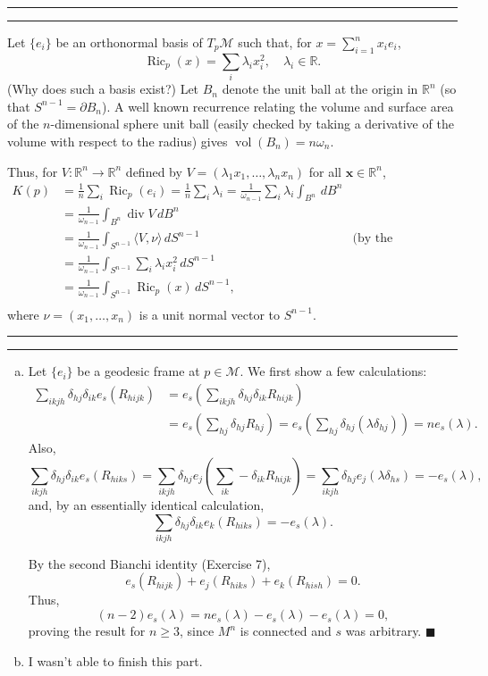 \documentclass[11pt]{article}
\newcounter{questionCounter}
\newcounter{partCounter}[questionCounter]
\newenvironment{question}[2][\arabic{questionCounter}]{%
    \setcounter{partCounter}{0}%
    \vspace{.25in} \hrule \vspace{0.5em}%
        \noindent{\bf #2}%
    \vspace{0.8em} \hrule \vspace{.10in}%
    \addtocounter{questionCounter}{1}%
}{}
\renewcommand{\qed}{\quad \ensuremath{\blacksquare}}    %
\newcommand{\bx}{\mathbf{x}}
\renewcommand{\div}{\operatorname{div}} %
\newcommand{\Ric}{\operatorname{Ric}}   %
\newcommand{\R}{\mathbb{R}}             %
\newcommand{\M}{\mathcal{M}}            %
\begin{document}
\begin{question}{Exercise 9}
Let $\{e_i\}$ be an orthonormal basis of $T_p\M$ such that, for
$x = \sum_{i = 1}^n x_ie_i$,
\[\Ric_p(x) = \sum_i \lambda_i x_i^2,\quad \lambda_i \in \R.\]
(Why does such a basis exist?)
Let $B_n$ denote the unit ball at the origin in $\R^n$ (so that
$S^{n - 1} = \partial B_n$). A well known recurrence relating the volume and
surface area of the $n$-dimensional sphere unit ball (easily checked by taking
a derivative of the volume with respect to the radius) gives
$\operatorname{vol}(B_n) = n \omega_n$.

Thus, for $V : \R^n \to \R^n$ defined by
$V = (\lambda_1 x_1,\dots,\lambda_n x_n)$ for all $\bx \in \R^n$,
\begin{align*}
K(p)
 &  = \frac{1}{n} \sum_i \Ric_p(e_i)
    = \frac{1}{n} \sum_i \lambda_i
    = \frac{1}{\omega_{n - 1}} \sum_i \lambda_i \int_{B^n} \, dB^n \\
 &  = \frac{1}{\omega_{n - 1}} \int_{B^n} \div V \, dB^n \\
 &  = \frac{1}{\omega_{n - 1}} \int_{S^{n - 1}}
                                        \langle V, \nu \rangle \, dS^{n - 1}
 & \mbox{(by the Divergence Theorem)}      \\
 &  = \frac{1}{\omega_{n - 1}} \int_{S^{n - 1}}
                                        \sum_i \lambda_i x_i^2 \, dS^{n - 1} \\
 &  = \frac{1}{\omega_{n - 1}} \int_{S^{n - 1}} \Ric_p(x) \, dS^{n - 1}, \\
\end{align*}
where $\nu = (x_1,\dots,x_n)$ is a unit normal vector to $S^{n - 1}$.
\end{question}

\begin{question}{Exercise 10}
\begin{enumerate}[a)]
\item Let $\{e_i\}$ be a geodesic frame at $p \in \M$. We first show a few
calculations:
\begin{align*}
\sum_{ikjh} \delta_{hj}\delta_{ik}e_s(R_{hijk})
 &  = e_s \left( \sum_{ikjh} \delta_{hj}\delta_{ik} R_{hijk} \right) \\
 &  = e_s \left( \sum_{hj} \delta_{hj} R_{hj} \right)               
    = e_s \left( \sum_{hj} \delta_{hj}(\lambda\delta_{hj})  \right)
    = ne_s(\lambda).
\end{align*}
Also,
\[
\sum_{ikjh} \delta_{hj}\delta_{ik} e_s(R_{hiks})
 = \sum_{ikjh} \delta_{hj} e_j \left( \sum_{ik} -\delta_{ik} R_{hijk} \right)
 = \sum_{ikjh} \delta_{hj} e_j(\lambda \delta_{hs})
 = -e_s(\lambda),
\]
and, by an essentially identical calculation,
\[\sum_{ikjh} \delta_{hj}\delta_{ik}e_k(R_{hiks}) = -e_s(\lambda).\]

By the second Bianchi identity (Exercise 7),
\[e_s(R_{hijk}) + e_j(R_{hiks}) + e_k(R_{hish}) = 0.\]
Thus,
\[(n - 2) e_s(\lambda)
    = ne_s(\lambda) - e_s(\lambda) - e_s(\lambda)
    = 0,
\]
proving the result for $n \geq 3$, since $M^n$ is connected and $s$ was
arbitrary.  \qed

\item I wasn't able to finish this part.
\end{enumerate}
\end{question}
\end{document}
